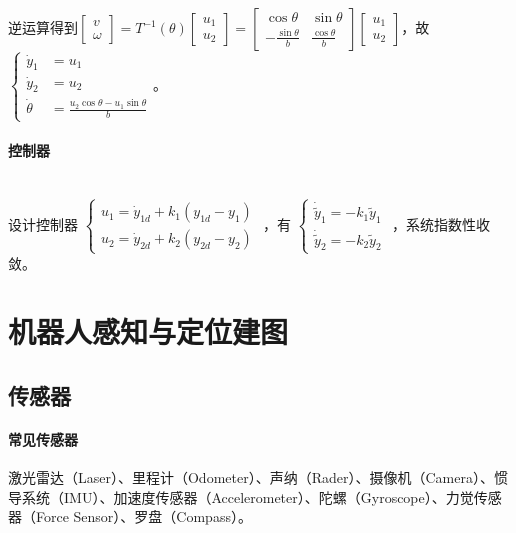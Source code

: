\documentclass[
12pt, %
a4paper, 
oneside, %
headinclude,footinclude, %
]{scrartcl}
\begin{document}
逆运算得到$ \begin{bmatrix} v \\ \omega \end{bmatrix} = T^{-1}(\theta) \begin{bmatrix} u_1 \\ u_2 \end{bmatrix} = \begin{bmatrix} \cos\theta & \sin\theta \\ -\frac{\sin\theta}{b} & \frac{\cos\theta}{b} \end{bmatrix} \begin{bmatrix} u_1 \\ u_2 \end{bmatrix} $，故%
$
\begin{cases}
\dot{y}_1 &= u_1 \\
\dot{y}_2 &= u_2 \\
\dot{\theta} &= \frac{u_2 \cos\theta - u_1 \sin\theta}{b}
\end{cases}
$。
\paragraph{控制器}~\\

设计控制器
$ 
\begin{cases}
u_1 = \dot{y}_{1d} + k_1(y_{1d} - y_1) \\
u_2 = \dot{y}_{2d} + k_2(y_{2d} - y_2)
\end{cases} 
$%
，有%
$
\begin{cases}
\dot{\tilde{y}}_1 = -k_1\tilde{y}_1 \\
\dot{\tilde{y}}_2 = -k_2\tilde{y}_2
\end{cases}
$%
，系统指数性收敛。
\section{机器人感知与定位建图}
\subsection[传感器]{传感器}
\paragraph{常见传感器}
激光雷达（Laser）、里程计（Odometer）、声纳（Rader）、摄像机（Camera）、惯导系统（IMU）、加速度传感器（Accelerometer）、陀螺（Gyroscope）、力觉传感器（Force Sensor）、罗盘（Compass）。
\end{document}
